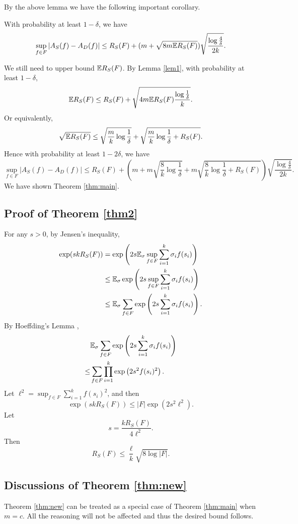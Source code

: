 By the above lemma we have the following important corollary.
\begin{corollary}
With probability at least $1-\delta$, we have
$$\sup_{f\in F}|A_S(f) - A_D(f)| \leq R_S(F) + (m+\sqrt{8m \mathbb{E} R_S(F)})\sqrt{\frac{\log \frac{4}{\delta}}{2k}}.$$
\end{corollary}

We still need to upper bound $\mathbb{E} R_S(F)$. By Lemma \ref{lem1}, with probability at least $1-\delta$,
$$\mathbb{E} R_S(F) \leq R_S(F) + \sqrt{4m\mathbb{E} R_S(F)\frac{\log \frac{1}{\delta}}{k}}.$$
Or equivalently,
$$\sqrt{\mathbb{E} R_S(F)} \leq \sqrt{\frac{m}{k}\log \frac{1}{\delta}} + \sqrt{\frac{m}{k}\log \frac{1}{\delta} + R_S(F)}.$$
Hence with probability at least $1-2\delta$, we have
$$\sup_{f\in F}|A_S(f) - A_D(f)| \leq R_S(F) + \left(m+m\sqrt{\frac{8}{k}\log \frac{1}{\delta}} + m\sqrt{\frac{8}{k}\log \frac{1}{\delta} + R_S(F)}\right)\sqrt{\frac{\log \frac{4}{\delta}}{2k}}.$$
We have shown Theorem \ref{thm:main}.


\subsection{Proof of Theorem \ref{thm2}}
For any $s>0$, by Jensen's inequality,
$$\begin{aligned}
\exp(skR_S(F)) & = \exp\left(2s\mathbb{E}_\sigma \sup_{f\in F} \sum_{i=1}^k \sigma_i f(s_i)\right) \\
&\leq \mathbb{E}_\sigma \exp\left(2s \sup_{f\in F} \sum_{i=1}^k \sigma_i f(s_i)\right) \\
&\leq \mathbb{E}_\sigma \sum_{f\in F} \exp\left(2s\sum_{i=1}^k \sigma_i f(s_i)\right).
\end{aligned}$$
By Hoeffding's Lemma \cite{H63},
$$\begin{aligned}
&\mathbb{E}_\sigma \sum_{f\in F} \exp\left(2s\sum_{i=1}^k \sigma_i f(s_i)\right) \\
\leq & \sum_{f\in F}\prod_{i=1}^k \exp\left(2s^2f(s_i)^2\right).
\end{aligned}$$
Let $\ell^2 = \sup_{f\in F}\sum_{i=1}^k f(s_i)^2$, and then
$$\exp(skR_S(F)) \leq |F| \exp\left(2s^2\ell^2\right).$$
Let
$$s = \frac{kR_S(F)}{4\ell^2}.$$
Then 
$$R_S(F) \leq \frac{\ell}{k}\sqrt{8\log |F|}.$$ 


\subsection{Discussions of Theorem \ref{thm:new}}
Theorem \ref{thm:new} can be treated as a special case of Theorem \ref{thm:main} when $m=c$. All the reasoning will not be affected and thus the desired bound follows.